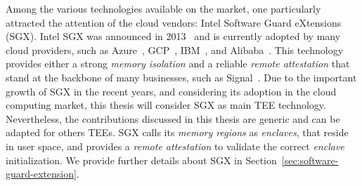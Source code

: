 Among the various technologies available on the market, one particularly 
attracted the attention of the cloud vendors: Intel Software Guard eXtensions 
(SGX).
Intel SGX was announced in 2013~\citep{rozas2013intel} and is currently 
adopted 
by many cloud providers, such as Azure~\citep{azure}, 
GCP~\citep{challita2018precise}, IBM~\citep{IBM}, and 
Alibaba~\citep{alibabasgx}.
This technology provides either a strong \emph{memory isolation} and a 
reliable 
\emph{remote attestation} that stand at the backbone of many businesses, such 
as Signal~\citep{signal}.
Due to the important growth of SGX in the recent years, and considering its 
adoption in the cloud computing market, this thesis will consider SGX as main 
TEE technology.
Nevertheless, the contributions discussed in this thesis are generic and can be 
adapted for others TEEs.
SGX calls its \emph{memory regions} as \emph{enclaves}, that reside in 
user space, and provides a \emph{remote attestation} to validate the correct 
\emph{enclave} initialization.
We provide further details about SGX in 
Section~\ref{sec:software-guard-extension}.


